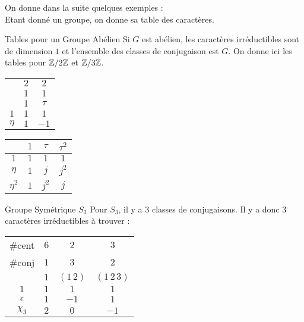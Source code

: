 \documentclass{cours}
\begin{document}
On donne dans la suite quelques exemples :\\
Etant donné un groupe, on donne sa table des caractères.
\begin{propositionfr}{Tables pour un Groupe Abélien}{}
    Si $G$ est abélien, les caractères irréductibles sont de dimension $1$ et l'ensemble des classes de conjugaison est $G$. On donne ici les tables pour $\mathbb{Z}/2\mathbb{Z}$ et $\mathbb{Z}/3\mathbb{Z}$.
    \begin{center}
        \begin{tabular}{c|cc}
                   & $2$ & $2$    \\
                   & $1$ & $1$    \\
                   & $1$ & $\tau$ \\
            \midrule
            $1$    & $1$ & $1$    \\
            $\eta$ & $1$ & $-1$
        \end{tabular}
        \hspace{.2\linewidth}
        \begin{tabular}{c|ccc}
                       & $1$ & $\tau$  & $\tau^{2}$ \\
            \midrule
            $1$        & $1$ & $1$     & $1$        \\
            $\eta$     & $1$ & $j$     & $j^{2}$    \\
            $\eta^{2}$ & $1$ & $j^{2}$ & $j$
        \end{tabular}
    \end{center}
\end{propositionfr}



\begin{propositionfr}{Groupe Symétrique $S_{3}$}{}
    Pour $S_{3}$, il y a $3$ classes de conjugaisons. Il y a donc $3$ caractères irréductibles à trouver :
    \begin{center}
        \begin{tabular}{c|ccc}
            \#cent     & $6$ & $2$       & $3$            \\
            \#conj     & $1$ & $3$       & $2$            \\
                       & $1$ & $(1\, 2)$ & $(1\, 2 \, 3)$ \\
            \midrule
            $1$        & $1$ & $1$       & $1$            \\
            $\epsilon$ & $1$ & $-1$      & $1$            \\
            $\chi_{3}$ & $2$ & $0$       & $-1$
        \end{tabular}
    \end{center}
\end{propositionfr}
\end{document}
